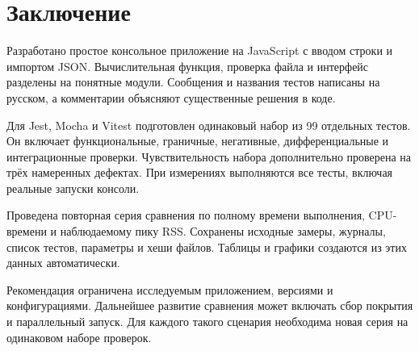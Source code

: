 \chapter*{Заключение}
Разработано простое консольное приложение на JavaScript с вводом строки и импортом JSON. Вычислительная функция, проверка файла и интерфейс разделены на понятные модули. Сообщения и названия тестов написаны на русском, а комментарии объясняют существенные решения в коде.

Для Jest, Mocha и Vitest подготовлен одинаковый набор из 99 отдельных тестов. Он включает функциональные, граничные, негативные, дифференциальные и интеграционные проверки. Чувствительность набора дополнительно проверена на трёх намеренных дефектах. При измерениях выполняются все тесты, включая реальные запуски консоли.

Проведена повторная серия сравнения по полному времени выполнения, CPU-времени и наблюдаемому пику RSS. Сохранены исходные замеры, журналы, список тестов, параметры и хеши файлов. Таблицы и графики создаются из этих данных автоматически.



Рекомендация ограничена исследуемым приложением, версиями и конфигурациями. Дальнейшее развитие сравнения может включать сбор покрытия и параллельный запуск. Для каждого такого сценария необходима новая серия на одинаковом наборе проверок.
\label{body-end}
